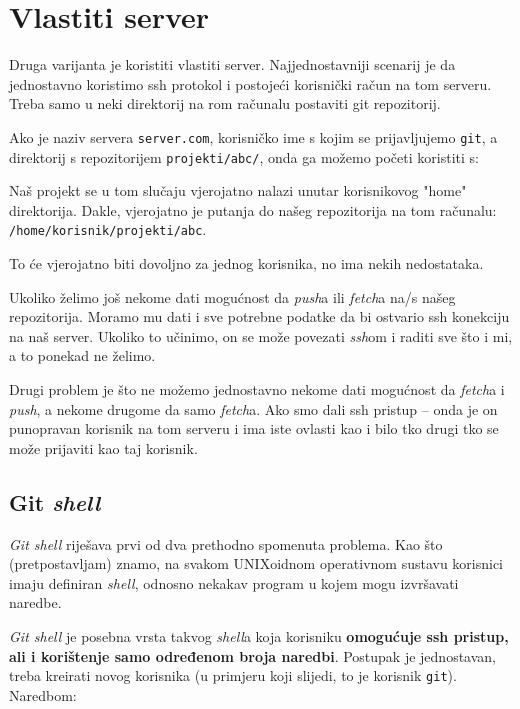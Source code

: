 \section*{Vlastiti server}

Druga varijanta je koristiti vlastiti server.
Najjednostavniji scenarij je da jednostavno koristimo ssh protokol i postojeći korisnički račun na tom serveru. 
Treba samo u neki direktorij na rom računalu postaviti git repozitorij.

Ako je naziv servera \verb+server.com+, korisničko ime s kojim se prijavljujemo \verb+git+, a direktorij s repozitorijem \verb+projekti/abc/+, onda ga možemo početi koristiti s:


Naš projekt se u tom slučaju vjerojatno nalazi unutar korisnikovog "home" direktorija.
Dakle, vjerojatno je putanja do našeg repozitorija na tom računalu: \\\verb+/home/korisnik/projekti/abc+.

To će vjerojatno biti dovoljno za jednog korisnika, no ima nekih nedostataka.

Ukoliko želimo još nekome dati mogućnost da \emph{push}a ili \emph{fetch}a na/s našeg repozitorija. 
Moramo mu dati i sve potrebne podatke da bi ostvario ssh konekciju na naš server.
Ukoliko to učinimo, on se može povezati \emph{ssh}om i raditi sve što i mi, a to ponekad ne želimo.

Drugi problem je što ne možemo jednostavno nekome dati mogućnost da \emph{fetch}a i \emph{push}, a nekome drugome da samo \emph{fetch}a.
Ako smo dali ssh pristup -- onda je on punopravan korisnik na tom serveru i ima iste ovlasti kao i bilo tko drugi tko se može prijaviti kao taj korisnik.

\subsection*{Git \emph{shell}}

\emph{Git shell} riješava prvi od dva prethodno spomenuta problema. 
Kao što (pretpostavljam) znamo, na svakom UNIXoidnom operativnom sustavu korisnici imaju definiran \emph{shell}, odnosno nekakav program u kojem mogu izvršavati naredbe.

\emph{Git shell} je posebna vrsta takvog \emph{shell}a koja korisniku \textbf{omogućuje ssh pristup, ali i korištenje samo određenom broja naredbi}.
Postupak je jednostavan, treba kreirati novog korisnika (u primjeru koji slijedi, to je korisnik \verb+git+).
Naredbom:

